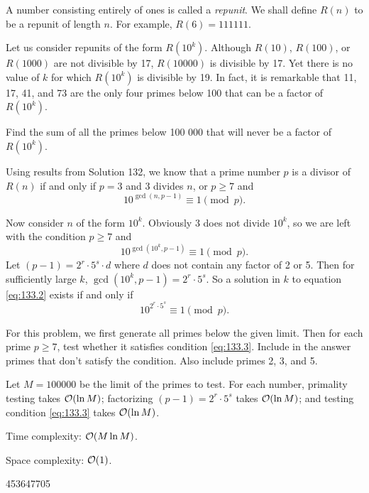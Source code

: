 




A number consisting entirely of ones is called a \emph{repunit}. We shall define $R(n)$ to be a repunit of length $n$. For example, $R(6) = 111111$.

Let us consider repunits of the form $R(10^k)$. Although $R(10)$, $R(100)$, or $R(1000)$ are not divisible by 17, $R(10000)$ is divisible by 17. Yet there is no value of $k$ for which $R(10^k)$ is divisible by 19. In fact, it is remarkable that 11, 17, 41, and 73 are the only four primes below 100 that can be a factor of $R(10^k)$.

Find the sum of all the primes below 100 000 that will never be a factor of $R(10^k)$.

\solution

Using results from Solution 132, we know that a prime number $p$ is a divisor of $R(n)$ if and only if $p=3$ and 3 divides $n$, or $p \ge 7$ and
\begin{equation}
10^{\gcd(n, p-1)} \equiv 1 \pmod{p} . \label{eq:133.1}
\end{equation}

Now consider $n$ of the form $10^k$. Obviously 3 does not divide $10^k$, so we are left with the condition $p \ge 7$ and
\begin{equation}
10^{\gcd(10^k, p-1)} \equiv 1 \pmod{p} . \label{eq:133.2}
\end{equation}
Let $(p-1) = 2^r \cdot 5^s \cdot d$ where $d$ does not contain any factor of 2 or 5. Then for sufficiently large $k$, $\gcd(10^k, p-1) = 2^r \cdot 5^s$. So a solution in $k$ to equation \eqref{eq:133.2} exists if and only if
\begin{equation}
10^{2^r \cdot 5^s} \equiv 1 \pmod{p} . \label{eq:133.3}
\end{equation}

For this problem, we first generate all primes below the given limit. Then for each prime $p \ge 7$, test whether it satisfies condition \eqref{eq:133.3}. Include in the answer primes that don't satisfy the condition. Also include primes 2, 3, and 5.

\complexity

Let $M = 100000$ be the limit of the primes to test. For each number, primality testing takes $\mathcal{O}(\ln M)$; factorizing $(p-1) = 2^r \cdot 5^s$ takes $\mathcal{O}(\ln M)$; and testing condition \eqref{eq:133.3} takes $\mathcal{O}(\ln M)$.

Time complexity: $\mathcal{O}(M \ln M)$.

Space complexity: $\mathcal{O}(1)$.

\answer

453647705


